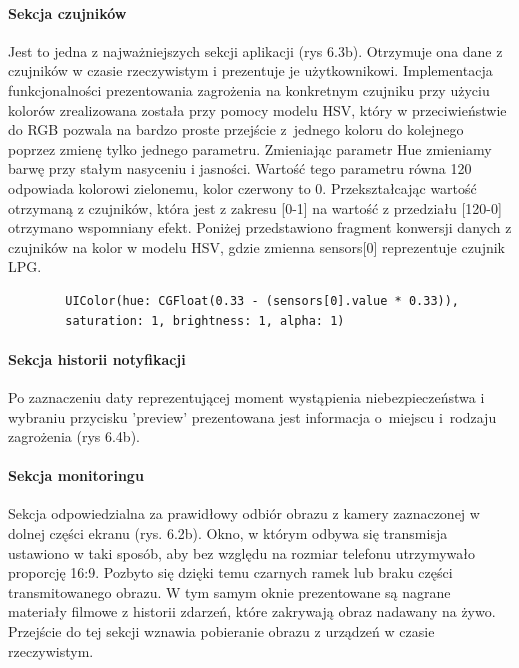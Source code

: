 \documentclass[polish,bachelor,a4paper,oneside]{ppfcmthesis}
\begin{document}
    \paragraph{Sekcja czujników}
    Jest to jedna z najważniejszych sekcji aplikacji (rys 6.3b).  Otrzymuje ona dane z czujników w czasie rzeczywistym i prezentuje je użytkownikowi. Implementacja funkcjonalności prezentowania zagrożenia na konkretnym czujniku przy użyciu kolorów zrealizowana została przy pomocy modelu HSV, który w przeciwieństwie do RGB pozwala na bardzo proste przejście z~jednego koloru do kolejnego poprzez zmienę tylko jednego parametru. Zmieniając parametr Hue zmieniamy barwę przy stałym nasyceniu i jasności. Wartość tego parametru równa 120\textdegree{} odpowiada kolorowi zielonemu, kolor czerwony to 0\textdegree{}. Przekształcając wartość otrzymaną z czujników, która jest z zakresu [0-1] na wartość z przedziału [120-0] otrzymano wspomniany efekt.
    Poniżej przedstawiono fragment konwersji danych z czujników na kolor w modelu HSV, gdzie zmienna sensors[0] reprezentuje czujnik LPG.
    \begin{verbatim}
        UIColor(hue: CGFloat(0.33 - (sensors[0].value * 0.33)),
        saturation: 1, brightness: 1, alpha: 1)
    \end{verbatim}


    \paragraph{Sekcja historii notyfikacji}
    Po zaznaczeniu daty reprezentującej moment wystąpienia niebezpieczeństwa i wybraniu przycisku 'preview' prezentowana jest informacja o~miejscu i~rodzaju zagrożenia (rys 6.4b).


    \paragraph{Sekcja monitoringu}
    Sekcja odpowiedzialna za prawidłowy odbiór obrazu z kamery zaznaczonej w dolnej części ekranu (rys. 6.2b). Okno, w którym odbywa się transmisja ustawiono w taki sposób, aby bez względu na rozmiar telefonu utrzymywało proporcję 16:9. Pozbyto się dzięki temu czarnych ramek lub braku części transmitowanego obrazu. W tym samym oknie prezentowane są nagrane materiały filmowe z historii zdarzeń, które zakrywają obraz nadawany na żywo. Przejście do tej sekcji wznawia pobieranie obrazu z urządzeń w czasie rzeczywistym.
\end{document}
